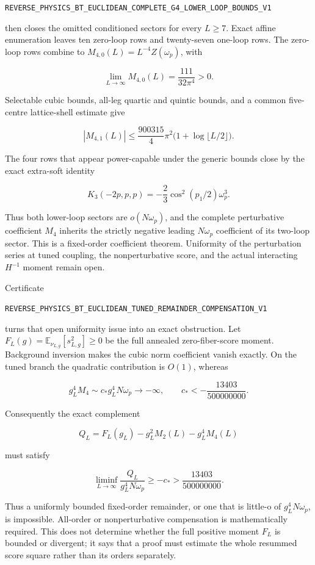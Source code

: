 \documentclass[11pt]{article}
\theoremstyle{definition}
\theoremstyle{remark}
\newcommand{\cert}[1]{\nolinkurl{#1}}
\begin{document}
\cert{REVERSE_PHYSICS_BT_EUCLIDEAN_COMPLETE_G4_LOWER_LOOP_BOUNDS_V1}

then closes the omitted conditioned sectors for every \(L\geq7\).  Exact
affine enumeration leaves ten zero-loop rows and twenty-seven one-loop rows.
The zero-loop rows combine to \(M_{4,0}(L)=L^{-4}Z(\omega_p)\), with

\[
 \lim_{L\to\infty}M_{4,0}(L)=\frac{111}{32\pi^4}>0.
\]

Selectable cubic bounds, all-leg quartic and quintic bounds, and a common
five-centre lattice-shell estimate give

\[
 |M_{4,1}(L)|\leq\frac{900315}{4}\pi^2
 \bigl(1+\log\lfloor L/2\rfloor\bigr).
\]

The four rows that appear power-capable under the generic bounds close by the
exact extra-soft identity

\[
 K_3(-2p,p,p)=-\frac23\cos^2(p_1/2)\omega_p^3.
\]

Thus both lower-loop sectors are \(o(N\omega_p)\), and the complete
perturbative coefficient \(M_4\) inherits the strictly negative leading
\(N\omega_p\) coefficient of its two-loop sector.  This is a fixed-order
coefficient theorem.  Uniformity of the perturbation series at tuned
coupling, the nonperturbative score, and the actual interacting \(H^{-1}\)
moment remain open.

Certificate

\cert{REVERSE_PHYSICS_BT_EUCLIDEAN_TUNED_REMAINDER_COMPENSATION_V1}

turns that open uniformity issue into an exact obstruction.  Let
\(F_L(g)=\mathbb E_{\nu_{L,g}}[s_{L,g}^2]\geq0\) be the full annealed
zero-fiber-score moment.  Background inversion makes the cubic norm
coefficient vanish exactly.  On the tuned branch the quadratic contribution
is \(O(1)\), whereas

\[
 g_L^4M_4\sim c_*g_L^4N\omega_p\longrightarrow-\infty,
 \qquad
 c_*<-\frac{13403}{500000000}.
\]

Consequently the exact complement

\[
 Q_L=F_L(g_L)-g_L^2M_2(L)-g_L^4M_4(L)
\]

must satisfy

\[
 \liminf_{L\to\infty}\frac{Q_L}{g_L^4N\omega_p}
 \geq-c_*>
 \frac{13403}{500000000}.
\]

Thus a uniformly bounded fixed-order remainder, or one that is little-o of
\(g_L^4N\omega_p\), is impossible.  All-order or nonperturbative compensation
is mathematically required.  This does not determine whether the full
positive moment \(F_L\) is bounded or divergent; it says that a proof must
estimate the whole resummed score square rather than its orders separately.
\end{document}
